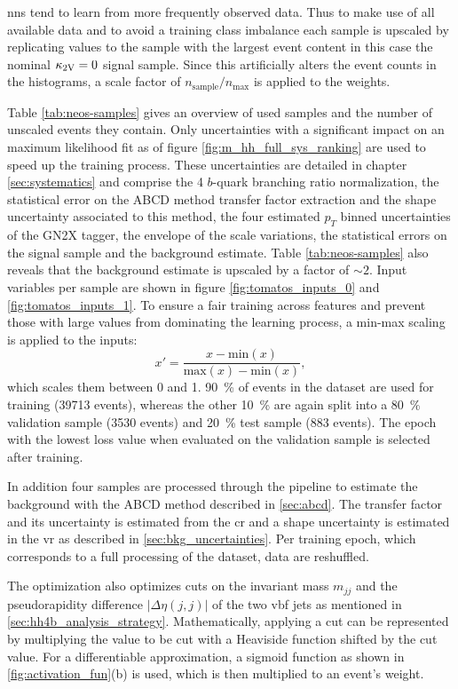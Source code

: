 \acp{nn} tend to learn from more frequently observed data. Thus to make use of all available data and to avoid a training class imbalance each sample is upscaled by replicating values to the sample with the largest event content in this case the nominal $\kappa_{\text{2V}}=0$ signal sample. Since this artificially alters the event counts in the histograms, a scale factor of $n_\text{sample}/n_\text{max}$ is applied to the weights.

Table \ref{tab:neos-samples} gives an overview of used samples and the number of unscaled events they contain. Only uncertainties with a significant impact on an \mhh{} maximum likelihood fit as of figure \ref{fig:m_hh_full_sys_ranking} are used to speed up the training process. These uncertainties are detailed in chapter \ref{sec:systematics} and comprise the 4 $b$-quark branching ratio normalization, the statistical error on the ABCD method transfer factor extraction and the shape uncertainty associated to this method, the four estimated $p_T$ binned uncertainties of the GN2X tagger, the envelope of the scale variations, the statistical errors on the \ktwov signal sample and the background estimate. Table \ref{tab:neos-samples} also reveals that the background estimate is upscaled by a factor of $\sim 2$. Input variables per sample are shown in figure \ref{fig:tomatos_inputs_0} and \ref{fig:tomatos_inputs_1}. To ensure a fair training across features and prevent those with large values from dominating the learning process, a min-max scaling is applied to the inputs:
\begin{equation}
    x'=\frac{x - \text{min}(x)}{\text{max}(x)-\text{min}(x)},
\end{equation}
which scales them between 0 and 1. \qty[]{90}{\percent} of events in the dataset are used for training (39713 events), whereas the other \qty[]{10}{\percent} are again split into a \qty[]{80}{\percent} validation sample (3530 events) and \qty[]{20}{\percent} test sample (883 events). The epoch with the lowest loss value when evaluated on the validation sample is selected after training.

In addition four samples are processed through the pipeline to estimate the background with the ABCD method described in \ref{sec:abcd}. The transfer factor and its uncertainty is estimated from the \ac{cr} and a shape uncertainty is estimated in the \ac{vr} as described in \ref{sec:bkg_uncertainties}. Per training epoch, which corresponds to a full processing of the dataset, data are reshuffled.

The optimization also optimizes cuts on the invariant mass $m_{jj}$ and the pseudorapidity difference $|\Delta\eta(j,j)|$ of the two \ac{vbf} jets as mentioned in \ref{sec:hh4b_analysis_strategy}. Mathematically, applying a cut can be represented by multiplying the value to be cut with a Heaviside function shifted by the cut value. For a differentiable approximation, a sigmoid function as shown in \ref{fig:activation_fun}(b) is used, which is then multiplied to an event's weight.

